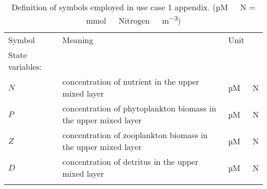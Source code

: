 \documentclass[template.tex]{subfiles}
\begin{document}
\begin{table*}[t]

\caption{ Definition of symbols employed in use case 1 appendix. (\unit{µM \ N} = \unit{mmol \ Nitrogen \ m^{-3}}) }

\begin{tabular}{l l l}
Symbol & Meaning & Unit\\
\tophline
\tophline
State variables:\\
\middlehline
$N$ & concentration of nutrient in the upper mixed layer & \unit{µM \ N} \\
$P$ & concentration of phytoplankton biomass in the upper mixed layer & \unit{µM \ N} \\
$Z$ & concentration of zooplankton biomass in the upper mixed layer & \unit{µM \ N} \\
$D$ & concentration of detritus in the upper mixed layer & \unit{µM \ N} \\
\\


\end{tabular}
\end{table*}
\end{document}
